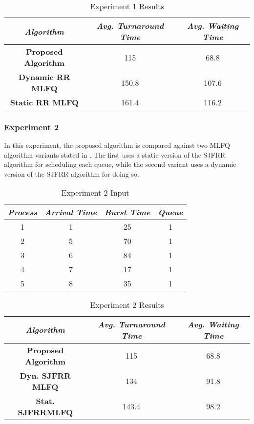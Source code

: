 \documentclass[conference]{IEEEtran}
\newcommand\T{\rule{0pt}{2.6ex}}       %
\newcommand\B{\rule[-1.2ex]{0pt}{0pt}} %
\begin{document}
\begin{table}[H]
    \caption{Experiment 1 Results}
    \centering
    \begin{tabular}{||c c c||}
        \hline
        \textit{\textbf{Algorithm}} & \textit{\textbf{Avg. Turnaround Time}} & \textit{\textbf{Avg. Waiting Time}}\T \B \\
    \hline
    \hline
    \textbf{Proposed Algorithm} & 115 & 68.8 \T \B\\ \hline
    \textbf{Dynamic RR MLFQ} & 150.8 & 107.6\T \B\\ \hline
    \textbf{Static RR MLFQ} & 161.4 & 116.2 \T \B\\ \hline
     \end{tabular}
\end{table}

\subsubsection{Experiment 2}

In this experiment, the proposed algorithm is compared against two MLFQ algorithm variants stated in \cite{b4}. The first uses a static version of the SJFRR algorithm for scheduling each queue, while the second variant uses a dynamic version of the SJFRR algorithm for doing so. 

\begin{table}[H]
    \caption{Experiment 2 Input}
    \centering
     \begin{tabular}{||c c c c||} 
     \hline
     \textit{\textbf{Process}} & \textit{\textbf{Arrival Time}} & \textit{\textbf{Burst Time}} & \textit{\textbf{Queue}} \T \B \\ 
     \hline
     \hline
     1 & 1 & 25 & 1 \T \B \\ 
     \hline
     2 & 5 & 70 & 1 \T \B \\
     \hline
     3 & 6 & 84 & 1 \T \B \\
     \hline
     4 & 7 & 17 & 1 \T \B \\
     \hline
     5 & 8 & 35 & 1 \T \B \\ 
     \hline
     \end{tabular}
\end{table}

\begin{table}[H]
    \caption{Experiment 2 Results}
    \centering
    \begin{tabular}{||c c c||}
        \hline
        \textit{\textbf{Algorithm}} & \textit{\textbf{Avg. Turnaround Time}} & \textit{\textbf{Avg. Waiting Time}}\T \B \\
    \hline
    \hline
    \textbf{Proposed Algorithm} & 115 & 68.8 \T \B\\ \hline
    \textbf{Dyn. SJFRR MLFQ} & 134 & 91.8\T \B\\ \hline
    \textbf{Stat. SJFRRMLFQ} & 143.4 & 98.2 \T \B\\ \hline
     \end{tabular}
\end{table}
\end{document}
